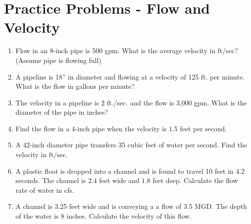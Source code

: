 \section*{Practice Problems - Flow and Velocity}
\begin{enumerate}

\item Flow in an 8-inch pipe is 500 gpm. What is the average velocity in ft/sec? (Assume pipe is flowing full)

\item A pipeline is 18” in diameter and flowing at a velocity of 125 ft. per minute. What is the flow in gallons per minute?

\item The velocity in a pipeline is 2 ft./sec. and the flow is 3,000 gpm. What is the diameter of the pipe in inches?



\item Find the flow in a 4-inch pipe when the velocity is $1.5$ feet per second.

  \item A 42-inch diameter pipe transfers 35 cubic feet of water per second. Find the velocity in $\mathrm{ft} / \mathrm{sec}$. 
  
  \item A plastic float is dropped into a channel and is found to travel 10 feet in $4.2$ seconds. The channel is $2.4$ feet wide and $1.8$ feet deep. Calculate the flow rate of water in cfs.
  
  \item A channel is 3.25 feet wide and is conveying a a flow of 3.5 MGD. The depth of the water is 8 inches. Calculate the velocity of this flow.\\

\end{enumerate}



